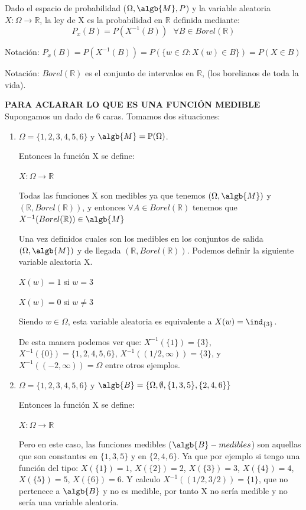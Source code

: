 \documentclass{apuntes}
\begin{document}
\begin{defn}[ley de X]
Dado el espacio de probabilidad ($\Omega, \algb{M}, P$) y la variable aleatoria $X: \Omega \rightarrow \mathbb{R}$, la ley de X es la probabilidad en $\mathbb{R}$ definida mediante:
\[
P_x(B)=P(X^{-1}(B)) \text{ } \forall B \in Borel(\mathbb{R})
\]

Notación: $P_x(B) = P(X^{-1}(B)) = P(\{w \in \Omega : X(w) \in B\})=P(X \in B)$

Notación: $Borel(\mathbb{R})$ es el conjunto de intervalos en $\mathbb{R}$, (los borelianos de toda la vida).


\end{defn}


\begin{example}

\textbf{ PARA ACLARAR LO QUE ES UNA FUNCIÓN MEDIBLE }Supongamos un dado de 6 caras. Tomamos dos situaciones:
\begin{enumerate}
\item  $\Omega = \{1,2,3,4,5,6\}$ y $\algb{M}=\mathbb{P}(\Omega)$.

Entonces la función X se define:

$X: \Omega \rightarrow \mathbb{R}$

Todas las funciones X son medibles ya que tenemos $(\Omega,\algb{M})$ y $(\mathbb{R}, Borel(\mathbb{R}))$, y entonces $\forall A \in Borel(\mathbb{R})$ tenemos que $X^{-1}(Borel(\mathbb{R})) \in \algb{M}$

Una vez definidos cuales son los medibles en los conjuntos de salida $(\Omega,\algb{M})$ y de llegada $(\mathbb{R}, Borel(\mathbb{R}))$. Podemos definir la siguiente variable aleatoria X.

$X(w) = 1$ si $w=3$

$X(w) = 0$ si $w\neq3$

Siendo $w \in \Omega$, esta variable aleatoria es equivalente a $X(w) = \ind_{\{3\}}$.

De esta manera podemos ver que: $X^{-1}(\{1\}) = \{3\}$, $X^{-1}(\{0\}) = \{1,2,4,5,6\}$, $X^{-1}((1/2,\infty)) = \{3\}$, y $X^{-1}((-2,\infty)) = \Omega$ entre otros ejemplos.


\item $\Omega = \{1,2,3,4,5,6\}$ y $\algb{B} = \{\Omega, \emptyset, \{1,3,5\}, \{2,4,6\} \}$

Entonces la función X se define:

$X: \Omega \rightarrow \mathbb{R}$

Pero en este caso, las funciones medibles ($\algb{B}-medibles$) son aquellas que son constantes en $\{1,3,5\}$ y en $\{2,4,6\}$. Ya que por ejemplo si tengo una función del tipo: $X(\{1\})=1$, $X(\{2\})=2$, $X(\{3\})=3$, $X(\{4\})=4$, $X(\{5\})=5$, $X(\{6\})=6$. Y calculo $X^{-1}((1/2, 3/2))=\{1\}$, que no pertenece a $\algb{B}$ y no es medible, por tanto X no sería medible y no sería una variable aleatoria.
\end{enumerate}


\end{example}
\end{document}
